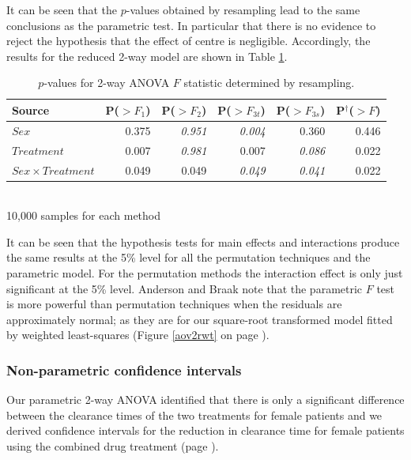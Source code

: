It can be seen that the $p$-values obtained by resampling lead to the same conclusions as the parametric test. In particular that there is no evidence to reject the hypothesis that the effect of centre is negligible. Accordingly, the results for the reduced 2-way model are shown in Table \ref{aovresampr}.
\begin{table}[h]
\centering
\caption{$p$-values for 2-way ANOVA $F$ statistic determined by resampling.}\label{aovresampr}
\begin{tabular}{l|rrrr|r}                   
Source						&P($>F_{1}$)&P($>F_{2}$)&P($>F_{3t}$)&P($>F_{3s}$)&P$^{\dag}$($>F$)\\
\hline
$Sex$        					& 0.375 & \small{\textit{0.951}} & \small{\textit{0.004}} & 0.360 & 0.446 \\  
$Treatment$  					& 0.007 & \small{\textit{0.981}} & 0.007 			   & \small{\textit{0.086}} & 0.022 \\
$Sex\times Treatment$     		& 0.049 & 0.049 			& \small{\textit{0.049}} & \small{\textit{0.041}} & 0.022 \\
\end{tabular}\\
10,000 samples for each method
\end{table}
It can be seen that the hypothesis tests for main effects and interactions produce the same results at the 5\% level for all the permutation techniques and the parametric model. For the permutation  methods the interaction effect is only just significant at the 5\% level. Anderson and Braak \cite{anderson} note that the parametric $F$ test is more powerful than permutation techniques when the residuals are approximately normal; as they are for our square-root transformed model fitted by weighted least-squares (Figure \ref{aov2rwt} on page \pageref{aov2rwt}).

\subsubsection*{Non-parametric confidence intervals}
Our parametric 2-way ANOVA identified that there is only a significant difference between the clearance times of the two treatments for female patients and we derived confidence intervals for the reduction in clearance time for female patients using the combined drug treatment (page \pageref{compinf}).


